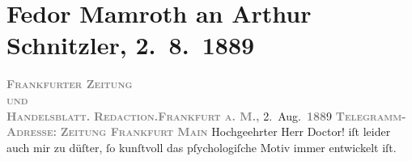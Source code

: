 

         \renewcommand{\erwaehnteInstitutionen}{Institutionen: Frankfurter Zeitung}
         \renewcommand{\erwaehnteOrte}{Orte: Frankfurt am Main, Wien}
         \renewcommand{\erwaehnteWerke}{Werke: Der Sohn. Aus den Papieren eines Arztes, Frankfurter Zeitung, Weihnachts-Einkäufe}
               \section[Fedor Mamroth an Arthur Schnitzler, 2. 8. 1889]{ Fedor Mamroth an Arthur Schnitzler, 2. 8. 1889}\nopagebreak{}\rehead{ }\begin{ledgroupsized}[t]{13cm}\normalsize\beginnumbering \toendnotes[C]{\smallbreak\pagebreak[2]} 
\toendnotes[C]{\smallbreak}\pstart
           \noindent{}{\pb}\textcolor{gray}{\textbf{\textsc{Frankfurter Zeitung}}}{\\}\textcolor{gray}{\textbf{\textsc{und}}}{\\}\textcolor{gray}{\textbf{\textsc{Handelsblatt.}}}\pend
           \pstart
           \textcolor{gray}{\textbf{\textsc{Redaction.}}}\hfill \textcolor{gray}{\textbf{\textsc{Frankfurt a. M.,}}}{ }2. Aug. \textcolor{gray}{\textbf{\textsc{188}}}9\pend
           \pstart
           \textcolor{gray}{\textbf{\textsc{Telegramm-Adresse:}}}\pend
           \pstart
           \textcolor{gray}{\textbf{\textsc{Zeitung Frankfurt Main}}}\pend
           \pstart{}Hochgeehrter Herr Doctor!\pend\pstart
           \label{K_L00001-1v}\label{K_L00001-1h} iſt leider auch mir zu düſter, ſo kunſtvoll das pſychologiſche Motiv
               immer entwickelt iſt.\pend

\end{ledgroupsized}
